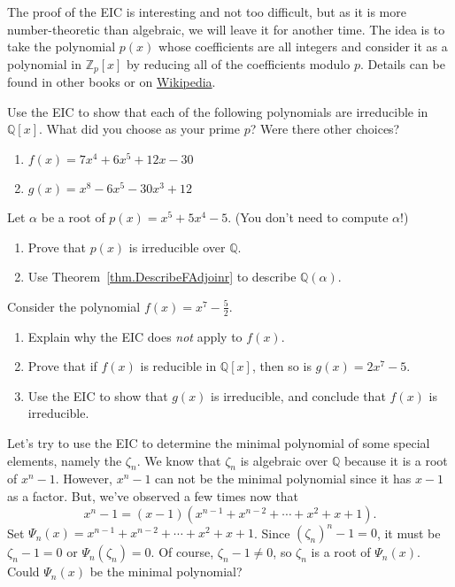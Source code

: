 The proof of the EIC is  interesting and not too difficult, but as it is more  number-theoretic than algebraic, we will leave it for another time.  The idea is to take the polynomial $p(x)$ whose coefficients are all integers and consider it as a polynomial in $\mathbb{Z}_p[x]$ by reducing all of the coefficients modulo $p$.
Details can be found in other books or on \href{https://en.wikipedia.org/wiki/Eisenstein\%27s_criterion}{Wikipedia}. 

\begin{problem}
Use the EIC to show that each of the following polynomials are irreducible in $\mathbb{Q}[x]$. What did you choose as your prime $p$? Were there other choices?
\begin{enumerate}
\item  $f(x) = 7x^{4}+6x^5 + 12x-30$
\item  $g(x) = x^{8}-6x^5 -30x^3 + 12$
\end{enumerate}
\end{problem}

\begin{problem}\label{prob.DescribeQRootx55x45}
Let $\alpha$ be a root of $p(x) = x^5 + 5x^4 - 5$. (You don't need to compute $\alpha$!)
\begin{enumerate}
\item Prove that $p(x)$ is irreducible over $\mathbb{Q}$.
\item Use Theorem~\ref{thm.DescribeFAdjoinr} to describe $\mathbb{Q}(\alpha)$.
\end{enumerate}
\end{problem}

\begin{problem}
Consider the polynomial $f(x) = x^7 - \frac{5}{2}$.
\begin{enumerate}
\item Explain why the EIC does \emph{not} apply to $f(x)$.
\item Prove that if $f(x)$ is reducible in $\mathbb{Q}[x]$, then so is $g(x) = 2x^7 - 5$.
\item Use the EIC to show that $g(x)$ is irreducible, and conclude that $f(x)$ is irreducible.
\end{enumerate}
\end{problem}

Let's try to use the EIC to determine the minimal polynomial of some special elements, namely the $\zeta_n$. We know that $\zeta_n$ is algebraic over $\mathbb{Q}$ because it is a root of $x^n-1$. However, $x^n-1$ can not be the minimal polynomial since it has $x-1$ as a factor. But, we've observed a few times now that \[x^n-1 = (x-1)(x^{n-1} + x^{n-2} + \cdots + x^2 + x + 1).\]
Set $\Psi_n(x) =  x^{n-1} + x^{n-2} + \cdots + x^2 + x + 1$. Since $(\zeta_n)^n-1 = 0$, it must be $\zeta_n-1 = 0$ or $\Psi_n(\zeta_n) = 0$. Of course, $\zeta_n-1 \neq 0$, so $\zeta_n$ is a root of $\Psi_n(x)$. Could $\Psi_n(x)$ be the minimal polynomial?

